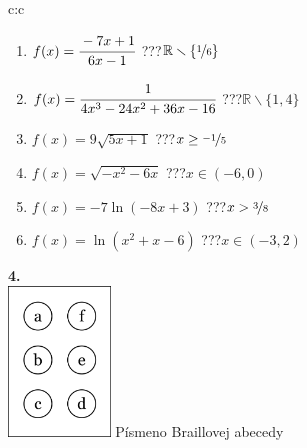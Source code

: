 \documentclass[10pt]{report}
\begin{document}
\begin{tabular}{c:c}
\begin{minipage}[c][104.5mm][t]{0.5\linewidth}
\begin{center}
\begin{minipage}{0.79\linewidth}
\begin{center}
\begin{varwidth}{\linewidth}
\begin{enumerate}
\normalsizerrr
\item $f(x)=\cfrac{-7x+1}{6x-1}$\quad \dotfill\; ???\;\dotfill \quad $\mathbb{R}\smallsetminus\{\nicefrac{1}{6}\}$
\item $f(x)=\cfrac{1}{4x^3-24x^2+36x-16}$\quad \dotfill\; ???\;\dotfill \quad $\mathbb{R}\smallsetminus\{1,4\}$
\item $f(x)=9\sqrt{5x+1}$\quad \dotfill\; ???\;\dotfill \quad $x\geq\nicefrac{-1}{5}$
\item $f(x)=\sqrt{-x^2-6x}$\quad \dotfill\; ???\;\dotfill \quad $x\in(-6 , 0)$
\item $f(x)=-7\ln{(-8x+3)}$\quad \dotfill\; ???\;\dotfill \quad $x>\nicefrac{3}{8}$
\item $f(x)=\ln{(x^2+x-6)}$\quad \dotfill\; ???\;\dotfill \quad $x\in(-3 , 2)$
\end{enumerate}
\end{varwidth}
\end{center}
\end{minipage}
\begin{minipage}{0.20\linewidth}
\begin{center}
{\Huge\bfseries 4.} \\[2mm]
\includegraphics[height=40mm]{../images/braille.png}
{\small Písmeno Braillovej abecedy}
\end{center}
\end{minipage}
\end{center}
\end{minipage}
%
\end{tabular}
\newpage
\thispagestyle{empty}
\end{document}
